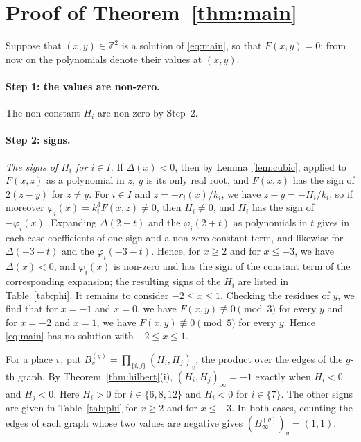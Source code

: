 \documentclass[11pt]{article}
\newcommand{\Z}{\mathbb{Z}}
\begin{document}
\section{Proof of Theorem~\ref{thm:main}}

Suppose that $(x,y)\in\Z^2$ is a solution of \eqref{eq:main}, so that $F(x,y)=0$; from now on the polynomials denote their values at $(x,y)$.
\paragraph{Step 1: the values are non-zero.} The non-constant $H_i$ are non-zero by Step~2.

\paragraph{Step 2: signs.} \emph{The signs of $H_i$ for $i\in I$.} If $\Delta(x)<0$, then by Lemma~\ref{lem:cubic}, applied to $F(x,z)$ as a polynomial in $z$, $y$ is its only real root, and $F(x,z)$ has the sign of $2(z-y)$ for $z\neq y$. For $i\in I$ and $z=-r_i(x)/k_i$, we have $z-y=-H_i/k_i$, so if moreover $\varphi_i(x)=k_i^3F(x,z)\neq0$, then $H_i\neq0$, and $H_i$ has the sign of $-\varphi_i(x)$. Expanding $\Delta(2+t)$ and the $\varphi_i(2+t)$ as polynomials in $t$ gives in each case coefficients of one sign and a non-zero constant term, and likewise for $\Delta(-3-t)$ and the $\varphi_i(-3-t)$. Hence, for $x\geq2$ and for $x\leq-3$, we have $\Delta(x)<0$, and $\varphi_i(x)$ is non-zero and has the sign of the constant term of the corresponding expansion; the resulting signs of the $H_i$ are listed in Table~\ref{tab:phi}. It remains to consider $-2\leq x\leq1$. Checking the residues of $y$, we find that for $x=-1$ and $x=0$, we have $F(x,y)\not\equiv0\pmod{3}$ for every $y$ and for $x=-2$ and $x=1$, we have $F(x,y)\not\equiv0\pmod{5}$ for every $y$. Hence \eqref{eq:main} has no solution with $-2\leq x\leq1$.

For a place $v$, put $B^{(g)}_v=\prod_{\{i,j\}}(H_i,H_j)_v$, the product over the edges of the $g$-th graph. By Theorem~\ref{thm:hilbert}(i), $(H_i,H_j)_\infty=-1$ exactly when $H_i<0$ and $H_j<0$. Here $H_i>0$ for $i\in\{6,\allowbreak 8,\allowbreak 12\}$ and $H_i<0$ for $i\in\{7\}$. The other signs are given in Table~\ref{tab:phi} for $x\geq2$ and for $x\leq-3$. In both cases, counting the edges of each graph whose two values are negative gives $(B^{(g)}_\infty)_g=(1,1)$.
\end{document}
